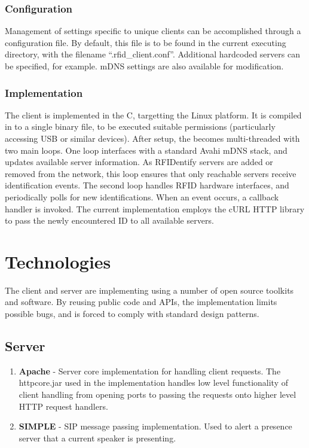 \documentclass{article}
\begin{document}
	\subsubsection{Configuration}
        Management of settings specific to unique clients can be accomplished through a configuration file.
        By default, this file is to be found in the current executing directory, with the filename ``.rfid\_client.conf''.
        Additional hardcoded servers can be specified, for example. mDNS settings are also available for 
        modification.


        \subsubsection{Implementation}
        The client is implemented in the C, targetting the Linux platform.  It is compiled in to a single 
        binary file, to be executed suitable permissions (particularly accessing USB or similar devices).
        After setup, the becomes multi-threaded with two main loops. One loop interfaces with a standard
        Avahi mDNS stack, and updates available server information.  As RFIDentify servers are added or 
        removed from the network, this loop ensures that only reachable servers receive identification events.
        The second loop handles RFID hardware interfaces, and periodically polls for new identifications.
        When an event occurs, a callback handler is invoked. The current implementation employs the 
        cURL HTTP library to pass the newly encountered ID to all available servers.


\section{Technologies}
	The client and server are implementing using a number of open source toolkits and software.
        By reusing public code and APIs, the implementation limits possible bugs, and is forced to comply
        with standard design patterns.

	\subsection{Server}
	
	\begin{enumerate}
	 \item	\textbf { Apache } -
	   Server core implementation for handling client requests. The httpcore.jar used in the implementation
	   handles low level functionality of client handling from opening ports to passing the requests onto 
           higher level HTTP request handlers.
			
	
	 \item  \textbf {SIMPLE } - 
	   SIP message passing implementation. Used to alert a presence server that a current speaker is presenting.
	\end{enumerate}
\end{document}
